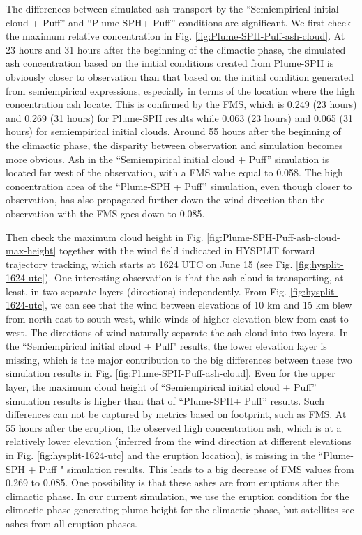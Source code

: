 \documentclass[utf8]{frontiersSCNS} %
\begin{document}
The differences between simulated ash transport by the ``Semiempirical initial cloud + Puff'' and ``Plume-SPH+ Puff'' conditions are significant. We first check the maximum relative concentration in Fig. \ref{fig:Plume-SPH-Puff-ash-cloud}. At 23 hours and 31 hours after the beginning of the climactic phase, the simulated ash concentration based on the initial conditions created from Plume-SPH is obviously closer to observation than that based on the initial condition generated from semiempirical expressions, especially in terms of the location where  the high concentration ash locate. This is confirmed by the FMS, which is 0.249 (23 hours) and 0.269 (31 hours) for Plume-SPH results while 0.063 (23 hours) and 0.065 (31 hours) for semiempirical initial clouds. Around 55 hours after the beginning of the climactic phase, the disparity between observation and simulation becomes more obvious. Ash in the ``Semiempirical initial cloud + Puff'' simulation is located far west of the observation, with a FMS value equal to 0.058. The high concentration area of the ``Plume-SPH + Puff'' simulation, even though closer to observation, has also propagated further down the wind direction than the observation with the FMS goes down to 0.085.

Then check the maximum cloud height in Fig. \ref{fig:Plume-SPH-Puff-ash-cloud-max-height} together with the wind field indicated in HYSPLIT forward trajectory tracking, which starts at 1624 UTC on June 15  (see Fig. \ref{fig:hysplit-1624-utc}). One interesting observation is that the ash cloud is transporting, at least, in two separate layers (directions) independently. From Fig. \ref{fig:hysplit-1624-utc}, we can see that the wind between elevations of 10 km and 15 km blew from north-east to south-west, while winds of higher elevation blew from east to west. The directions of wind naturally separate the ash cloud into two layers.  In the ``Semiempirical initial cloud + Puff" results, the lower elevation layer is missing, which is the major contribution to the big differences between these two simulation results  in Fig. \ref{fig:Plume-SPH-Puff-ash-cloud}. Even for the upper layer, the maximum cloud height of  ``Semiempirical initial cloud + Puff'' simulation results is higher than that of ``Plume-SPH+ Puff'' results. Such differences can not be captured by metrics based on footprint, such as FMS.  At 55 hours after the eruption, the observed high concentration ash, which is at a relatively lower elevation (inferred from the wind direction at different elevations in Fig. \ref{fig:hysplit-1624-utc} and the eruption location), is missing in the ``Plume-SPH + Puff " simulation results. This leads to a big decrease of FMS values from 0.269 to 0.085. One possibility is that these ashes are from eruptions after the climactic phase. In our current simulation, we use the eruption condition for the climactic phase generating plume height for the climactic phase, but satellites see ashes from all eruption phases. 
\end{document}

